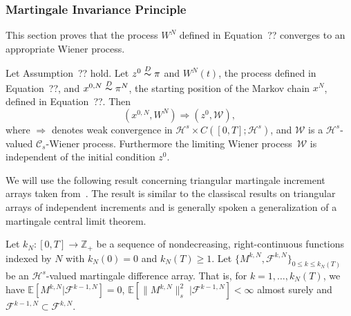 \subsubsection{Martingale Invariance Principle}
\label{Martingale invariance principle}

This section proves that the process $ W^{N} $ defined in Equation~?? converges to an appropriate Wiener process.

\begin{prop}
 \label{Invariance principle}
 Let Assumption~?? hold. Let $ z^0 \stackrel{D}{\thicksim} \pi $ and $ W^{N}(t) $, the process defined in Equation~??, and $ x^{0,N} \stackrel{D}{\thicksim} \pi^{N} $, the starting position of the Markov chain $ x^{N} $, defined in Equation~??. Then
 \begin{equation}
  (x^{0,N}, W^{N}) \Longrightarrow (z^0, \mathcal{W}),
 \end{equation}
 where $ \Longrightarrow $ denotes weak convergence in $ \mathcal{H}^s \times C \left( [0,T]; \mathcal{H}^s \right) $, and $ \mathcal{W}$ is a $ \mathcal{H}^s $-valued  $ \mathcal{C}_s $-Wiener process. Furthermore the limiting Wiener process~$ \mathcal{W} $ is independent of the initial condition $ z^0 $.
 
\end{prop}



We will use the following result concerning triangular martingale increment arrays taken from~\autocite{Berger1986}. The result is similar to the classiscal results on triangular arrays of independent increments and is generally spoken a generalization of a martingale central limit theorem.

Let $ k_{N}: [0,T] \to \mathbb{Z}_{+} $ be a sequence of nondecreasing, right-continuous functions indexed by $ N $ with $ k_{N}(0) = 0 $ and  $k_{N} (T) \geq 1 $. Let $ \{ M^{k,N}, \mathcal{F}^{k,N}  \}_{0 \leq k \leq k_{N}(T)} $ be an $ \mathcal{H}^s $-valued martingale difference array. That is, for $ k = 1,\dots , k_{N}(T) $, we have
$  \mathbb{E} \left[  M^{k,N} | \mathcal{F}^{k-1,N} \right] =  0 $,  $  \mathbb{E} \left[ \| M^{k,N} \|_{s}^{2} \; | \mathcal{F}^{k-1,N} \right] <  \infty $ almost surely
and $ \mathcal{F}^{k-1,N} \subset \mathcal{F}^{k,N} $.

